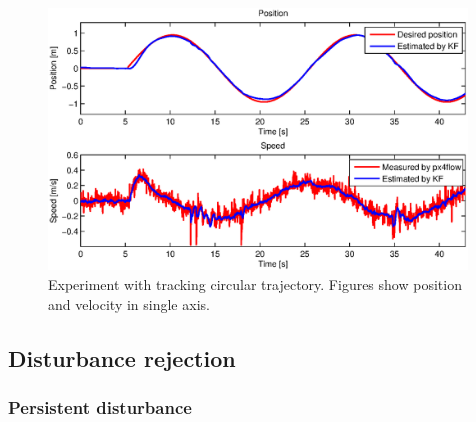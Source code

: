 \begin{figure}[H]
\centering
\includegraphics[width=0.99\textwidth]{fig/experiment1_sine.eps}
\caption{Experiment with tracking circular trajectory. Figures show position and velocity in single axis.}
\label{fig:experiment_sine_1}
\end{figure}

\subsection{Disturbance rejection}

\subsubsection{Persistent disturbance}

